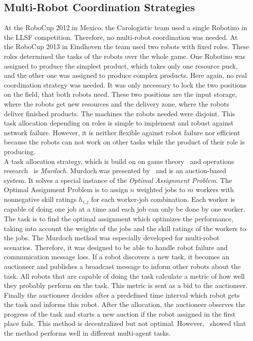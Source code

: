 \documentclass[a4paper,11pt]{article}
\begin{document}
\subsection{Multi-Robot Coordination Strategies}
At the RoboCup 2012 in Mexico, the Carologistic team used a single Robotino in the LLSF competition. Therefore, no multi-robot coordination was needed. At the RoboCup 2013 in Eindhoven the team used two robots with fixed roles. These roles determined the tasks of the robots over the whole game. One Robotino was assigned to produce the simplest product, which takes only one resource puck, and the other one was assigned to produce complex products. Here again, no real coordination strategy was needed. It was only necessary to lock the two positions on the field, that both robots need. These two positions are the input storage, where the robots get new resources and the delivery zone, where the robots deliver finished products. The machines the robots needed were disjoint. This task allocation depending on roles is simple to implement and robust against network failure. However, it is neither flexible against robot failure nor efficient because the robots can not work on other tasks while the product of their role is producing.\\
A task allocation strategy, which is build on on game theory~\cite{GameTheory} and operations research~\cite{OperationsResearch} is \textit{Murdoch}. Murdoch was presented by~\cite{DissMurdoch} and is an auction-based system. It solves a special instance of the \textit{Optimal Assignment Problem}. The Optimal Assignment Problem is to assign $n$ weighted jobs to $m$ workers with nonnegative skill ratings $h_{i,j}$ for each worker-job combination. Each worker is capable of doing one job at a time and each job can only be done by one worker. The task is to find the optimal assignment which optimizes the performance, taking into account the weights of the jobs and the skill ratings of the workers to the jobs. The Murdoch method was especially developed 
for multi-robot scenarios. Therefore, it was designed to be able to handle robot failure and communication message loss. If a robot discovers a new task, it becomes an auctioneer and publishes a broadcast message to inform other robots about the task. All robots that are capable of doing the task calculate a metric of how well they probably perform on the task. This metric is sent as a bid to the auctioneer. Finally the auctioneer decides after a predefined time interval which robot gets the task and informs this robot. After the allocation, the auctioneer observes the progress of the task and starts a new auction if the robot assigned in the first place fails. This method is decentralized but not optimal. However, \cite{DissMurdoch}~showed that the method performs well in different multi-agent tasks.\\
\end{document}

